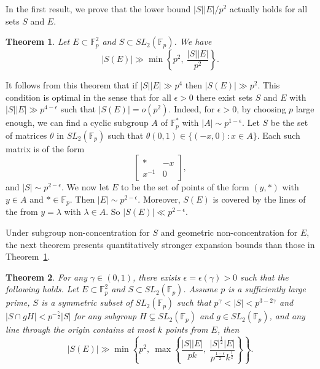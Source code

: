\documentclass[11pt]{article}
\newtheorem{theorem}{Theorem}[section]
\def\Fbb{\mathbb{F}}
\def\SL{SL}
\begin{document}
In the first result, we prove that the lower bound $|S||E|/p^2$ actually holds for all sets $S$ and $E$. 
\begin{theorem}\label{thm2}
    Let $E\subset \mathbb{F}_p^2$ and $S\subset SL_2(\mathbb{F}_p)$. We have 
    \[|S(E)|\gg \min \left\lbrace p^2, ~\frac{|S||E|}{p^2} \right\rbrace.\]
\end{theorem}
It follows from this theorem that if $|S||E|\gg p^4$ then $|S(E)|\gg p^2$. This condition is optimal in the sense that for all $\epsilon>0$ there exist sets $S$ and $E$ with $|S||E|\gg p^{4-\epsilon}$ such that $|S(E)|=o(p^2)$. Indeed, for $\epsilon>0$, by choosing $p$ large enough, we can find a cyclic subgroup $A$ of $\mathbb{F}_p^*$ with $|A|\sim p^{1-\epsilon}$. Let $S$ be the set of matrices $\theta$ in $SL_2(\mathbb{F}_p)$ such that $\theta(0, 1)\in \{(-x, 0)\colon x\in A \}$. Each such matrix is of the form
\[\begin{bmatrix}
    *&-x\\
    x^{-1} &0
\end{bmatrix},\]
and $|S|\sim p^{2-\epsilon}$. We now let $E$ to be the set of points of the form $(y, *)$ with $y\in A$ and $*\in \mathbb{F}_p$. Then $|E|\sim p^{2-\epsilon}$. Moreover, $S(E)$ is covered by the lines of the from $y=\lambda$ with $\lambda\in A$. So $|S(E)|\ll p^{2-\epsilon}$.

Under subgroup non-concentration for $S$ and geometric non-concentration for $E$, the next theorem presents quantitatively stronger expansion bounds than those in Theorem~\ref{thm2}.



\begin{theorem}\label{thm555}
For any $\gamma\in (0, 1)$, there exists $\epsilon=\epsilon(\gamma)>0$ such that the following holds. 
     Let $E\subset \mathbb{F}_p^2$ and $S\subset SL_2(\mathbb{F}_p)$. Assume $p$ is a sufficiently large prime, $S$ is a symmetric subset of $\SL_2 (\Fbb_p )$ such that $p^{\gamma} < |S| < p^{3-2\gamma } $ and $ |S \cap gH| < p^{-\frac{\gamma}{2}}|S|$ for any subgroup $H \subsetneq \SL_2 (\Fbb_p) $ and $g\in \SL_2(\Fbb_p)$, and any line through the origin contains at most $k$ points from $E$, then 
     \[|S(E)|\gg \min \left\lbrace p^2, ~\max\left\lbrace\frac{|S||E|}{pk}, ~\frac{|S|^{\frac{1}{2}}|E|}{p^{\frac{1-\epsilon}{2}}k^{\frac{1}{2}}}\right\rbrace \right\rbrace.\]
\end{theorem}
\end{document}
